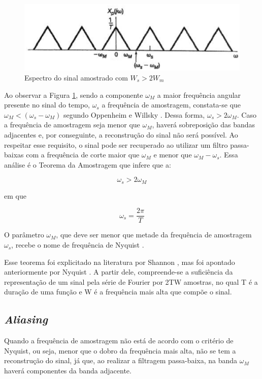 \begin{figure}[h]
	\centering
    \includegraphics[scale=0.5]{figuras/fig03.eps}
	\caption{Espectro do sinal amostrado com $W_s > 2W_m$ \cite{oppenheim2010sinais}}
	\label{fig03}
\end{figure}

Ao observar a Figura \ref{fig03}, sendo a componente $\omega_M$ a maior frequência angular presente no sinal do tempo, $\omega_s$ a frequência de amostragem, constata-se que $\omega_M < (\omega_s - \omega_M)$ segundo Oppenheim e Willsky \cite{oppenheim2010sinais}. Dessa forma, $\omega_s > 2\omega_M$. Caso a frequência de amostragem seja menor que $\omega_M$, haverá sobreposição das bandas adjacentes e, por conseguinte, a reconstrução do sinal não será possível. Ao respeitar esse requisito, o sinal pode ser recuperado ao utilizar um filtro passa-baixas com a frequência de corte maior que $\omega_M$ e menor que $\omega_M - \omega_s$.
Essa análise é o Teorema da Amostragem que infere que a:

\begin{equation} \label{eq:01}
\omega_s > 2\omega_M
\end{equation}

em que

\begin{equation} \label{eq:02}
\omega_s = \frac{2\pi}{T}
\end{equation}

O parâmetro $\omega_M$, que deve ser menor que metade da frequência de amostragem $\omega_s$, recebe o nome de frequência de Nyquist \cite{oppenheim2010sinais}.
\par
Esse teorema foi explicitado na literatura por Shannon \cite{Shannon}, mas foi apontado anteriormente por Nyquist \cite{nyquist}. A partir dele, compreende-se a suficiência da representação de um sinal pela série de Fourier por 2TW amostras, no qual T é a duração de uma função e W é a frequência mais alta que compõe o sinal.

\subsection{\textit{Aliasing}}
Quando a frequência de amostragem não está de acordo com o critério de Nyquist, ou seja, menor que o dobro da frequência mais alta, não se tem a reconstrução do sinal, já que, ao realizar a filtragem passa-baixa, na banda $\omega_M$ haverá componentes da banda adjacente.

